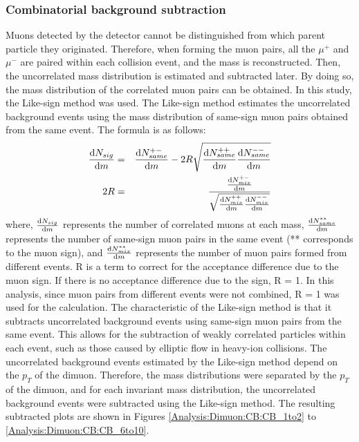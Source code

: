             \subsubsection{Combinatorial background subtraction}
            \label{Analysis:Dimuon:Combinatorial BG subtraction}
                Muons detected by the detector cannot be distinguished from which parent particle they originated. Therefore, when forming the muon pairs, all the $\mu^+$ and $\mu^-$ are paired within each collision event, and the mass is reconstructed. Then, the uncorrelated mass distribution is estimated and subtracted later. By doing so, the mass distribution of the correlated muon pairs can be obtained.
                In this study, the Like-sign method was used. The Like-sign method estimates the uncorrelated background events using the mass distribution of same-sign muon pairs obtained from the same event. The formula is as follows:
                \begin{eqnarray}
                    \dv{N_{sig}}{m} &=& \dv{N_{same}^{+-}}{m} - 2R \sqrt{\dv{N_{same}^{++}}{m} \dv{N_{same}^{--}}{m}}\\
                    2R &=& \frac{\dv{N_{mix}^{+-}}{m}}{\sqrt{\dv{N_{mix}^{++}}{m} \dv{N_{mix}^{--}}{m}}} 
                \end{eqnarray}
                where, $\dv{N_{sig}}{m}$ represents the number of correlated muons at each mass, $\dv{N_{same}^{**}}{m}$ represents the number of same-sign muon pairs in the same event (** corresponds to the muon sign), and $\dv{N_{mix}^{**}}{m}$ represents the number of muon pairs formed from different events. R is a term to correct for the acceptance difference due to the muon sign. If there is no acceptance difference due to the sign, R = 1. In this analysis, since muon pairs from different events were not combined, R = 1 was used for the calculation.
                The characteristic of the Like-sign method is that it subtracts uncorrelated background events using same-sign muon pairs from the same event. This allows for the subtraction of weakly correlated particles within each event, such as those caused by elliptic flow in heavy-ion collisions. The uncorrelated background events estimated by the Like-sign method depend on the $p_T$ of the dimuon. Therefore, the mass distributions were separated by the $p_T$ of the dimuon, and for each invariant mass distribution, the uncorrelated background events were subtracted using the Like-sign method. The resulting subtracted plots are shown in Figures \ref{Analysis:Dimuon:CB:CB_1to2} to \ref{Analysis:Dimuon:CB:CB_6to10}.

